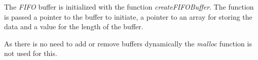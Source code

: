 The \emph{FIFO} buffer is initialized with the function \emph{createFIFOBuffer}.
The function is passed a pointer to the buffer to initiate, a pointer to an
array for storing the data and a value for the length of the buffer.

As there is no need to add or remove buffers dynamically the \emph{malloc}
function is not used for this.